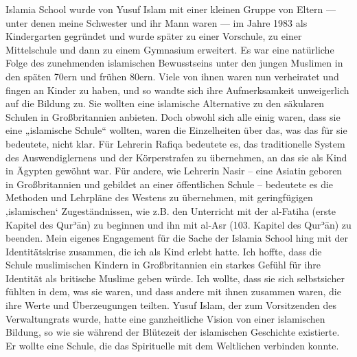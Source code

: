 \documentclass[12pt]{memoir}
\def\´{ʾ} %
\def \Quran{Qur\-\´ān} %
\def\–{\hskip0pt-\hskip0pt}
\begin{document}
Islamia School wurde von Yusuf Islam mit einer kleinen Gruppe von Eltern —
unter denen meine Schwester und ihr Mann waren —
im Jahre 1983 als Kindergarten gegründet
und wurde später zu einer Vorschule, zu einer Mittelschule
und dann zu einem Gymnasium erweitert.
Es war eine natürliche Folge des zunehmenden islamischen Bewusstseins
unter den jungen Muslimen in den späten 70ern und frühen 80ern.
Viele von ihnen waren nun verheiratet und fingen an Kinder zu haben,
und so wandte sich ihre Aufmerksamkeit unweigerlich auf die Bildung zu.
Sie wollten eine islamische Alternative zu
den säkularen Schulen in Großbritannien anbieten.
Doch obwohl sich alle einig waren, dass sie eine „islamische Schule“ wollten,
waren die Einzelheiten über das, was das für sie bedeutete, nicht klar.
Für Lehrerin Rafiqa bedeutete es, das traditionelle System
des Auswendiglernens und der Körperstrafen zu übernehmen,
an das sie als Kind in Ägypten gewöhnt war.
Für andere, wie Lehrerin Nasir – eine Asiatin geboren in Großbritannien
und gebildet an einer öffentlichen Schule –
bedeutete es die Methoden und Lehrpläne des Westens zu übernehmen,
mit geringfügigen ‚islamischen‘ Zugeständnissen,
wie z.B. den Unterricht mit der al\–Fatiha (erste Kapitel des \Quran)
zu beginnen und ihn mit al-Asr (103. Kapitel des \Quran) zu beenden.
Mein eigenes Engagement für die Sache der Islamia School
hing mit der Identitätskrise zusammen,
die ich als Kind erlebt hatte.
Ich hoffte, dass die Schule muslimischen Kindern in Großbritannien
ein starkes Gefühl für ihre Identität als britische Muslime geben würde.
Ich wollte, dass sie sich selbstsicher fühlten in dem, was sie waren,
und dass andere mit ihnen zusammen waren,
die ihre Werte und Überzeugungen teilten.
Yusuf Islam, der zum Vorsitzenden des Verwaltungrats wurde,
hatte eine ganzheitliche Vision von einer islamischen Bildung,
so wie sie während der Blütezeit der islamischen Geschichte existierte.
Er wollte eine Schule, die das Spirituelle mit dem Weltlichen verbinden konnte.
\end{document}
